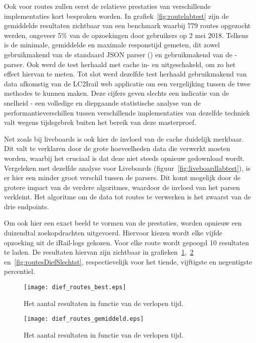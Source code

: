 Ook voor routes zullen eerst de relatieve prestaties van verschillende implementaties kort besproken worden. In grafiek~\ref{fig:routelabtest} zijn de gemiddelde resultaten zichtbaar van een benchmark waarbij 779 routes opgezocht werden, ongeveer 5\% van de opzoekingen door gebruikers op 2 mei 2018. Telkens is de minimale, gemiddelde en maximale responstijd gemeten, dit zowel gebruikmakend van de standaard JSON parser () en gebruikmakend van de -parser. Ook werd de test herhaald met cache in- en uitgeschakeld, om zo het effect hiervan te meten. Tot slot werd dezelfde test herhaald gebruikmakend van data afkomstig van de LC2Irail web applicatie om een vergelijking tussen de twee methodes te kunnen maken. Deze cijfers geven slechts een indicatie van de snelheid - een volledige en diepgaande statistische analyse van de performantieverschillen tussen verschillende implementaties van dezelfde techniek valt wegens tijdsgebrek buiten het bereik van deze masterproef.

Net zoals bij liveboards is ook hier de invloed van de cache duidelijk merkbaar. Dit valt te verklaren door de grote hoeveelheden data die verwerkt moeten worden, waarbij het cruciaal is dat deze niet steeds opnieuw gedownload wordt. Vergeleken met dezelfde analyse voor Liveboards (figuur~\ref{fig:liveboardlabtest}), is er hier een minder groot verschil tussen de parsers. Dit komt mogelijk door de grotere impact van de verdere algoritmes, waardoor de invloed van het parsen verkleint. Het algoritme om de data tot routes te verwerken is het zwaarst van de drie endpoints. %

Om ook hier een exact beeld te vormen van de prestaties, worden opnieuw een duizendtal zoekopdrachten uitgevoerd. Hiervoor kiezen wordt elke vijfde opzoeking uit de iRail-logs gekozen. Voor elke route wordt gepoogd 10 resultaten te laden. De resultaten hiervan zijn zichtbaar in grafieken~\ref{fig:routesDiefBest},~\ref{fig:routesDiefAvg} en~\ref{fig:routesDiefSlechtst}, respectievelijk voor het tiende, vijftigste en negentigste percentiel.

\begin{figure}[h]
	\centering
	\texttt{[image: dief\_routes\_best.eps]}
	\caption[Aantal resultaten routes in functie van de tijd (10e percentiel)]{Het aantal resultaten in functie van de verlopen tijd.}
	\label{fig:routesDiefBest}
\end{figure}

\begin{figure}[h]
	\centering
	\texttt{[image: dief\_routes\_gemiddeld.eps]}
	\caption[Aantal resultaten routes in functie van de tijd (mediaan)]{Het aantal resultaten in functie van de verlopen tijd.}
	\label{fig:routesDiefAvg}
\end{figure}


